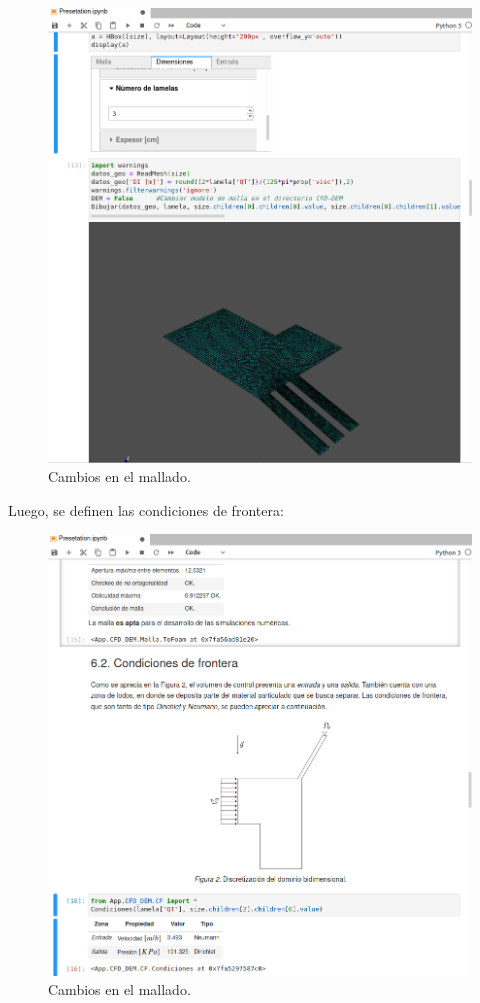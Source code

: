 \begin{figure}[h!]
	\centering
	\includegraphics[width=\textwidth]{Images/Anexos/10.png}
	\caption{Cambios en el mallado.}
	\label{CamMallaSoft}
\end{figure}

\newpage

\noindent
\justify

Luego, se definen las condiciones de frontera:

\begin{figure}[h!]
	\centering
	\includegraphics[width=\textwidth]{Images/Anexos/11.png}
	\caption{Cambios en el mallado.}
	\label{CamMallaSoft}
\end{figure}

